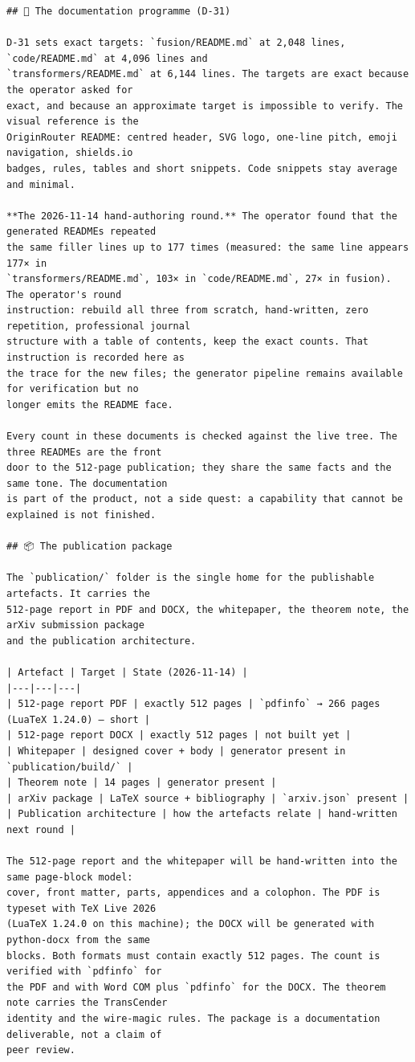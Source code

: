 \begin{Verbatim}[breaklines,breakanywhere,fontsize=\footnotesize]
## 📄 The documentation programme (D-31)

D-31 sets exact targets: `fusion/README.md` at 2,048 lines, `code/README.md` at 4,096 lines and
`transformers/README.md` at 6,144 lines. The targets are exact because the operator asked for
exact, and because an approximate target is impossible to verify. The visual reference is the
OriginRouter README: centred header, SVG logo, one-line pitch, emoji navigation, shields.io
badges, rules, tables and short snippets. Code snippets stay average and minimal.

**The 2026-11-14 hand-authoring round.** The operator found that the generated READMEs repeated
the same filler lines up to 177 times (measured: the same line appears 177× in
`transformers/README.md`, 103× in `code/README.md`, 27× in fusion). The operator's round
instruction: rebuild all three from scratch, hand-written, zero repetition, professional journal
structure with a table of contents, keep the exact counts. That instruction is recorded here as
the trace for the new files; the generator pipeline remains available for verification but no
longer emits the README face.

Every count in these documents is checked against the live tree. The three READMEs are the front
door to the 512-page publication; they share the same facts and the same tone. The documentation
is part of the product, not a side quest: a capability that cannot be explained is not finished.

## 📦 The publication package

The `publication/` folder is the single home for the publishable artefacts. It carries the
512-page report in PDF and DOCX, the whitepaper, the theorem note, the arXiv submission package
and the publication architecture.

| Artefact | Target | State (2026-11-14) |
|---|---|---|
| 512-page report PDF | exactly 512 pages | `pdfinfo` → 266 pages (LuaTeX 1.24.0) — short |
| 512-page report DOCX | exactly 512 pages | not built yet |
| Whitepaper | designed cover + body | generator present in `publication/build/` |
| Theorem note | 14 pages | generator present |
| arXiv package | LaTeX source + bibliography | `arxiv.json` present |
| Publication architecture | how the artefacts relate | hand-written next round |

The 512-page report and the whitepaper will be hand-written into the same page-block model:
cover, front matter, parts, appendices and a colophon. The PDF is typeset with TeX Live 2026
(LuaTeX 1.24.0 on this machine); the DOCX will be generated with python-docx from the same
blocks. Both formats must contain exactly 512 pages. The count is verified with `pdfinfo` for
the PDF and with Word COM plus `pdfinfo` for the DOCX. The theorem note carries the TransCender
identity and the wire-magic rules. The package is a documentation deliverable, not a claim of
peer review.


\end{Verbatim}
